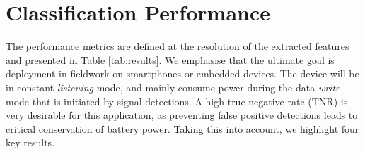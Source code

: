 \documentclass[10pt, twocolumn]{llncs}
\newcommand{\ikN}[1]{\todo[inline, size=\small, color=orange!30]{[ik] #1}}
\begin{document}

\section{Classification Performance}
\label{sec:results}

The performance metrics are defined at the resolution of the extracted features and presented in Table \ref{tab:results}. We emphasise that the ultimate goal is deployment in fieldwork on smartphones or embedded devices. The device will be in constant \emph{listening} mode, and mainly consume power during the data \emph{write} mode that is initiated by signal detections. A high true negative rate (TNR) is very desirable for this application, as preventing false positive detections leads to critical conservation of battery power. Taking this into account, we highlight four key results. 
\end{document}
